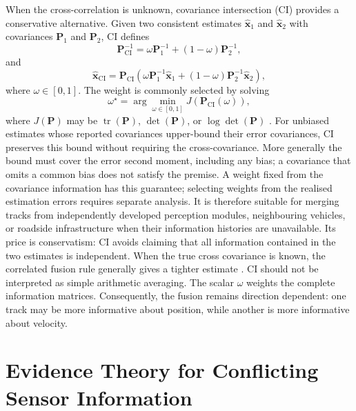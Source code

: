 When the cross-correlation is unknown, covariance intersection (CI)
provides a conservative alternative. Given two consistent estimates
$\widehat{\mathbf{x}}_{1}$ and $\widehat{\mathbf{x}}_{2}$ with covariances
$\mathbf{P}_{1}$ and $\mathbf{P}_{2}$, CI defines
\begin{equation}
\mathbf{P}_{\mathrm{CI}}^{-1}=\omega\mathbf{P}_{1}^{-1}+(1-\omega)\mathbf{P}_{2}^{-1},
\label{eq:ci-cov}
\end{equation}
and
\begin{equation}
\widehat{\mathbf{x}}_{\mathrm{CI}}=\mathbf{P}_{\mathrm{CI}}\left(\omega\mathbf{P}_{1}^{-1}\widehat{\mathbf{x}}_{1}+(1-\omega)\mathbf{P}_{2}^{-1}\widehat{\mathbf{x}}_{2}\right),
\label{eq:ci-est}
\end{equation}
where $\omega\in[0,1]$. The weight is commonly selected by solving
\begin{equation}
\omega^{\star}=\arg\min_{\omega\in[0,1]}J\!\left(\mathbf{P}_{\mathrm{CI}}(\omega)\right),
\label{eq:ci-weight}
\end{equation}
where $J(\mathbf{P})$ may be
$\operatorname{tr}(\mathbf{P})$,
$\det(\mathbf{P})$, or
$\log\det(\mathbf{P})$
\cite{uhlmann1995dynamic,julier1997nondivergent,julier2001general}. For unbiased estimates whose reported covariances upper-bound their error covariances, CI preserves this bound without requiring the cross-covariance. More generally the bound must cover the error second moment, including any bias; a covariance that omits a common bias does not satisfy the premise. A weight fixed from the covariance information has this guarantee; selecting weights from the realised estimation errors requires separate analysis. It is therefore suitable for merging tracks from independently developed
perception modules, neighbouring vehicles, or roadside infrastructure when their information histories are unavailable. Its price is conservatism: CI avoids claiming that all information contained in the two estimates is independent. When the true cross covariance is known, the correlated fusion rule generally gives a tighter estimate \cite{barshalom2011tracking,julier2001general}. CI should not be interpreted as simple arithmetic averaging. The scalar
$\omega$ weights the complete information matrices. Consequently, the
fusion remains direction dependent: one track may be more informative
about position, while another is more informative about velocity.



%
\section{Evidence Theory for Conflicting Sensor Information}
\label{sec:evidence}
%

